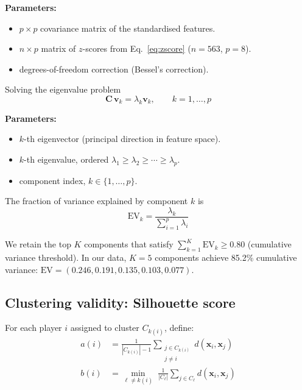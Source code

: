 \documentclass[11pt, a4paper, oneside, openany]{report}
\begin{document}
\noindent\textbf{Parameters:}
\begin{itemize}[leftmargin=2.2cm, itemsep=0pt, topsep=2pt]
    \item[$\mathbf{C}$] $p \times p$ covariance matrix of the standardised features.
    \item[$\mathbf{Z}$] $n \times p$ matrix of $z$-scores from Eq.~\eqref{eq:zscore} ($n = 563$, $p = 8$).
    \item[$n-1$] degrees-of-freedom correction (Bessel's correction).
\end{itemize}

Solving the eigenvalue problem
\begin{equation}
\label{eq:pca_eig}
\mathbf{C}\, \mathbf{v}_k = \lambda_k \mathbf{v}_k, \qquad k = 1, \ldots, p
\end{equation}

\noindent\textbf{Parameters:}
\begin{itemize}[leftmargin=2.2cm, itemsep=0pt, topsep=2pt]
    \item[$\mathbf{v}_k$] $k$-th eigenvector (principal direction in feature space).
    \item[$\lambda_k$] $k$-th eigenvalue, ordered $\lambda_1 \geq \lambda_2 \geq \cdots \geq \lambda_p$.
    \item[$k$] component index, $k \in \{1, \ldots, p\}$.
\end{itemize}

The fraction of variance explained by component $k$ is
\begin{equation}
\label{eq:pca_var}
\mathrm{EV}_k = \frac{\lambda_k}{\sum_{i=1}^{p} \lambda_i}
\end{equation}

We retain the top $K$ components that satisfy $\sum_{k=1}^{K} \mathrm{EV}_k \geq 0.80$ (cumulative variance threshold). In our data, $K = 5$ components achieve 85.2\% cumulative variance: $\mathrm{EV} = (0.246, 0.191, 0.135, 0.103, 0.077)$.

\subsection{Clustering validity: Silhouette score}

For each player $i$ assigned to cluster $C_{k(i)}$, define:
\begin{align}
a(i) &= \frac{1}{|C_{k(i)}| - 1} \sum_{\substack{j \in C_{k(i)} \\ j \neq i}} d(\mathbf{x}_i, \mathbf{x}_j) \label{eq:silhouette_a} \\
b(i) &= \min_{\ell \neq k(i)} \; \frac{1}{|C_\ell|} \sum_{j \in C_\ell} d(\mathbf{x}_i, \mathbf{x}_j) \label{eq:silhouette_b}
\end{align}
\end{document}
